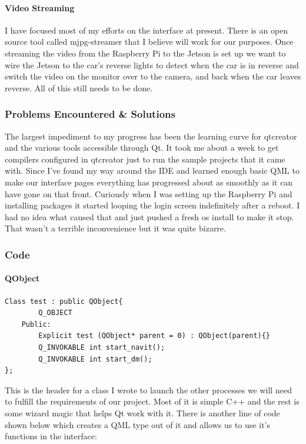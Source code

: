 \documentclass[onecolumn, draftclsnofoot,10pt, compsoc]{IEEEtran}
\begin{document}
\paragraph{Video Streaming}
I have focused most of my efforts on the interface at present. There is an open source tool called mjpg-streamer that I believe will work for our purposes. Once streaming the video from the Raspberry Pi to the Jetson is set up we want to wire the Jetson to the car's reverse lights to detect when the car is in reverse and switch the video on the monitor over to the camera, and back when the car leaves reverse. All of this still needs to be done.\par

\subsubsection{Problems Encountered \& Solutions}
The largest impediment to my progress has been the learning curve for qtcreator and the various tools accessible through Qt. It took me about a week to get compilers configured in qtcreator just to run the sample projects that it came with. Since I've found my way around the IDE and learned enough basic QML to make our interface pages everything has progressed about as smoothly as it can have gone on that front. Curiously when I was setting up the Raspberry Pi and installing packages it started looping the login screen indefinitely after a reboot. I had no idea what caused that and just pushed a fresh os install to make it stop. That wasn't a terrible inconvenience but it was quite bizarre.\par

\subsubsection{Code}
\paragraph{QObject}
\begin{verbatim}
Class test : public QObject{
		Q_OBJECT
	Public:
		Explicit test (QObject* parent = 0) : QObject(parent){}
		Q_INVOKABLE int start_navit();
		Q_INVOKABLE int start_dm();
};
\end{verbatim}

This is the header for a class I wrote to launch the other processes we will need to fulfill the requirements of our project. Most of it is simple C++ and the rest is some wizard magic that helps Qt work with it. There is another line of code shown below which creates a QML type out of it and allows us to use it's functions in the interface:\par
\end{document}
